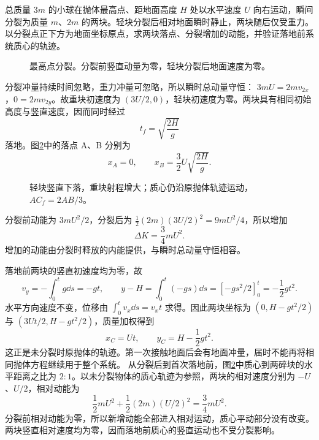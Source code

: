 \begin{exercise}[抛体在最高点分裂]\label{sup3:problem-exercise-2}\label{sup3:ex:d3-h2}
总质量 $3m$ 的小球在抛体最高点、距地面高度 $H$ 处以水平速度 $U$ 向右运动，瞬间分裂为质量 $m$、$2m$ 的两块。轻块分裂后相对地面瞬时静止，两块随后仅受重力。以分裂点正下方为地面坐标原点，求两块落点、分裂增加的动能，并验证落地前系统质心的轨迹。
\end{exercise}
\begin{figure}[H]\centering
{}
\caption{最高点分裂。分裂前竖直动量为零，轻块分裂后地面速度为零。}\label{sup3:fig:d3-h2-q}
\end{figure}
\begin{solution}
分裂冲量持续时间忽略，重力冲量可忽略，所以瞬时总动量守恒：
$3mU=2m v_{2x}$，$0=2m v_{2y}$。故重块初速度为 $(3U/2,0)$，轻块初速度为零。两块具有相同初始高度与竖直速度，因而同时经过
\[
t_f=\sqrt{\frac{2H}g}
\]
落地。图\ref{sup3:fig:d3-h2-s}中的落点 A、B 分别为
\[
x_A=0,\qquad x_B=\frac32U\sqrt{\frac{2H}g}.
\]
\begin{figure}[H]\centering
{}
\caption{轻块竖直下落，重块射程增大；质心仍沿原抛体轨迹运动，$AC_f=2AB/3$。}\label{sup3:fig:d3-h2-s}
\end{figure}
分裂前动能为 $3mU^2/2$，分裂后为
$\tfrac12(2m)(3U/2)^2=9mU^2/4$，所以增加
\[
\Delta K=\frac34mU^2.
\]
增加的动能由分裂时释放的内能提供，与瞬时总动量守恒相容。

落地前两块的竖直初速度均为零，故
\[
v_y=-\int_0^t g\dd s=-gt,
\qquad y-H=\int_0^t(-gs)\dd s=[-gs^2/2]_0^t=-\frac12gt^2.
\]
水平方向速度不变，位移由 $\int_0^t v_x\dd s=v_xt$ 求得。因此两块坐标为 $(0,H-gt^2/2)$ 与 $(3Ut/2,H-gt^2/2)$，质量加权得到
\[
x_C=Ut,\qquad y_C=H-\frac12gt^2.
\]
这正是未分裂时原抛体的轨迹。第一次接触地面后会有地面冲量，届时不能再将相同抛体方程继续用于整个系统。
从分裂后到首次落地前，图\ref{sup3:fig:d3-h2-s}中质心到两碎块的水平距离之比为 $2:1$。以未分裂物体的质心轨迹为参照，两块的相对速度分别为 $-U$、$U/2$，相对动能为
\[
\frac12mU^2+\frac12(2m)(U/2)^2=\frac34mU^2.
\]
分裂前相对动能为零，所以新增动能全部进入相对运动，质心平动部分没有改变。两块竖直相对速度均为零，因而落地前质心的竖直运动也不受分裂影响。

\end{solution}


